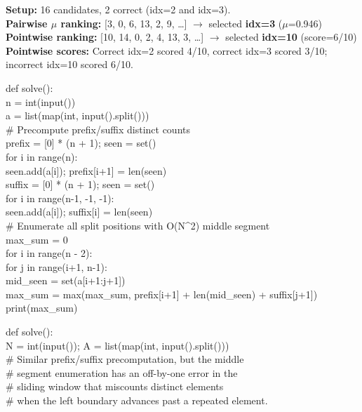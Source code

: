 \noindent\textbf{Setup:} 16 candidates, 2 correct (idx=2 and idx=3).\\
\textbf{Pairwise $\mu$ ranking:} [3, 0, 6, 13, 2, 9, \ldots] $\rightarrow$ selected \textbf{idx=3} ($\mu$=0.946) \checkmark\\
\textbf{Pointwise ranking:} [10, 14, 0, 2, 4, 13, 3, \ldots] $\rightarrow$ selected \textbf{idx=10} (score=6/10) \\
\textbf{Pointwise scores:} Correct idx=2 scored 4/10, correct idx=3 scored 3/10; incorrect idx=10 scored 6/10.

\begin{tcolorbox}[
    colback=green!5,
    colframe=green!60!black,
    title={\textbf{Pairwise-Selected Solution (idx=3): Correct \checkmark}},
    coltitle=white,
    fonttitle=\small\bfseries,
    breakable,
    enhanced
]
\small\ttfamily
def solve():\\
\quad n = int(input())\\
\quad a = list(map(int, input().split()))\\
\quad \# Precompute prefix/suffix distinct counts\\
\quad prefix = [0] * (n + 1); seen = set()\\
\quad for i in range(n):\\
\quad\quad seen.add(a[i]); prefix[i+1] = len(seen)\\
\quad suffix = [0] * (n + 1); seen = set()\\
\quad for i in range(n-1, -1, -1):\\
\quad\quad seen.add(a[i]); suffix[i] = len(seen)\\
\quad \# Enumerate all split positions with O(N\^{}2) middle segment\\
\quad max\_sum = 0\\
\quad for i in range(n - 2):\\
\quad\quad for j in range(i+1, n-1):\\
\quad\quad\quad mid\_seen = set(a[i+1:j+1])\\
\quad\quad\quad max\_sum = max(max\_sum, prefix[i+1] + len(mid\_seen) + suffix[j+1])\\
\quad print(max\_sum)
\end{tcolorbox}

\begin{tcolorbox}[
    colback=red!5,
    colframe=red!60!black,
    title={\textbf{Pointwise-Selected Solution (idx=10): Incorrect \ding{55}}},
    coltitle=white,
    fonttitle=\small\bfseries,
    breakable,
    enhanced
]
\small\ttfamily
def solve():\\
\quad N = int(input()); A = list(map(int, input().split()))\\
\quad \# Similar prefix/suffix precomputation, but the middle\\
\quad \# segment enumeration has an off-by-one error in the\\
\quad \# sliding window that miscounts distinct elements\\
\quad \# when the left boundary advances past a repeated element.
\end{tcolorbox}

